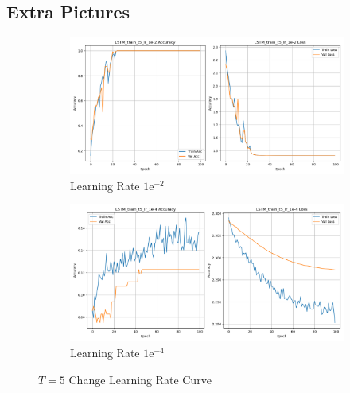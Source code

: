 \documentclass{article}
\begin{document}
\begin{appendix}

\section{Extra Pictures}

\begin{figure}[!htbp]
  \centering
  \begin{subfigure}[b]{1\textwidth}
    \includegraphics[width=\textwidth]{img/part1/LSTM_train_t5_lr_1e-2.png}
    \caption{Learning Rate $1\mathrm{e}^{-2}$}
  \end{subfigure}
  \begin{subfigure}[b]{1\textwidth}
    \includegraphics[width=\textwidth]{img/part1/LSTM_train_t5_lr_1e-4.png}
    \caption{Learning Rate $1\mathrm{e}^{-4}$}
  \end{subfigure}
  \caption{$T = 5$ Change Learning Rate Curve}
  \label{fig:p1_t5_lr_change}
\end{figure}


\end{appendix}
\end{document}
